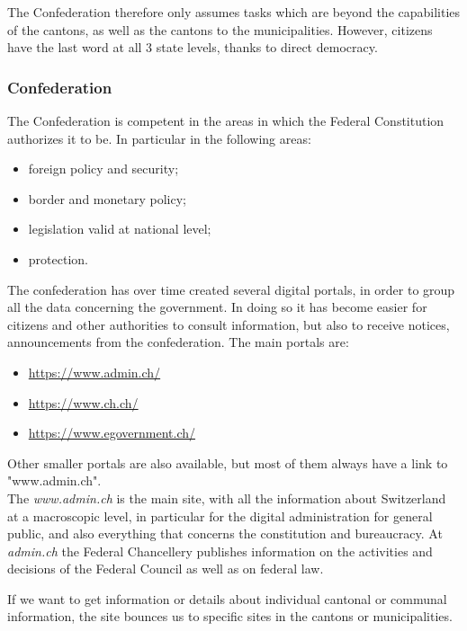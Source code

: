The Confederation therefore only assumes tasks which are beyond the capabilities of the cantons, as well as the cantons to the municipalities.
However, citizens have the last word at all 3 state levels, thanks to direct democracy.

\subsubsection{Confederation}
The Confederation is competent in the areas in which the Federal Constitution authorizes it to be. In particular in the following areas:
\begin{itemize}
\item foreign policy and security;
\item border and monetary policy;
\item legislation valid at national level;
\item protection.
\end{itemize}

The confederation has over time created several digital portals, in order to group all the data concerning the government. In doing so it has become easier for citizens and other authorities to consult information, but also to receive notices, announcements from the confederation. The main portals are:
\begin{itemize}
\item \url{https://www.admin.ch/}\cite{admin}
\item \url{https://www.ch.ch/}\cite{chch}
\item \url{https://www.egovernment.ch/}\cite{egovCH}
\end{itemize}
 
Other smaller portals are also available, but most of them always have a link to "www.admin.ch".\\
The \textit{www.admin.ch} is the main site, with all the information about Switzerland at a macroscopic level, in particular for the digital administration for general public, and also everything that concerns the constitution and bureaucracy.
At \textit{admin.ch} the Federal Chancellery publishes information on the activities and decisions of the Federal Council as well as on federal law. 


If we want to get information or details about individual cantonal or communal information, the site bounces us to specific sites in the cantons or municipalities.\\


